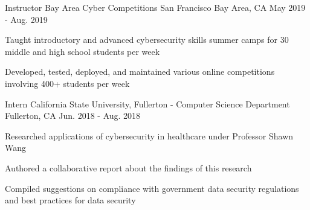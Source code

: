 

\begin{cventries}

  \cventry
    {Instructor} %
    {Bay Area Cyber Competitions} %
    {San Francisco Bay Area, CA} %
    {May 2019 - Aug. 2019} %
    {
      \begin{cvitems} %
        \item {Taught introductory and advanced cybersecurity skills summer camps for 30 middle and high school students per week}
        \item {Developed, tested, deployed, and maintained various online competitions involving 400+ students per week}
      \end{cvitems}
    }

  \cventry
    {Intern} %
    {California State University, Fullerton - Computer Science Department} %
    {Fullerton, CA} %
    {Jun. 2018 - Aug. 2018} %
    {
      \begin{cvitems} %
        \item {Researched applications of cybersecurity in healthcare under Professor Shawn Wang}
        \item {Authored a collaborative report about the findings of this research}
        \item {Compiled suggestions on compliance with government data security regulations and best practices for data security}
      \end{cvitems}
    }

\end{cventries}
